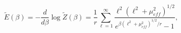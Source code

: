 \begin{equation}
\widetilde{E}\left(\beta \right)=-\frac{d}{d\beta }\log \widetilde{Z}\left(\beta \right)=\frac{1}{r}\sum _{\ell =1}^{\infty }\frac{\ell ^{2}\left(\ell ^{2}+\mu _{eff}^{2}\right)^{1/2}}{e^{\beta \left(\ell ^{2}+\mu _{eff}^{2}\right)^{1/2}/r}-1},\label{Thermal energy}\end{equation}


